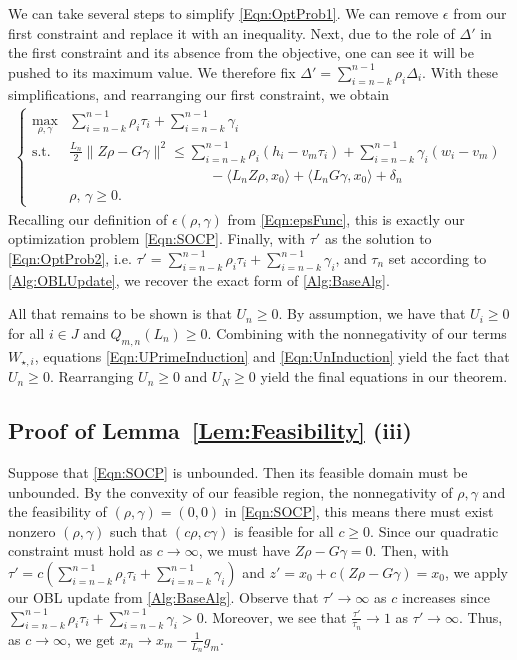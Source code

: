 \documentclass[11pt]{article}
\numberwithin{equation}{section}
\newcommand{\Ucoef}{\rho}
\newcommand{\Wcoef}{\gamma}
\newcommand{\idxArgmin}{m}
\newcommand{\idxMem}{k}
\newcommand{\idxSetSuccess}{J}
\newcommand{\epsFunc}{\epsilon(\Ucoef, \Wcoef)}
\newcommand{\ip}[2]{\sum_{i={n-\idxMem}}^{n-1} {#1}_i {#2}_i}
\newcommand{\fullSum}[1]{\sum_{i={n-\idxMem}}^{n-1} {#1}_i}
\newcommand{\norm}[1]{\|{#1}\|}
\theoremstyle{definition}
\theoremstyle{plain}
\theoremstyle{definition}
\begin{document}
We can take several steps to simplify \eqref{Eqn:OptProb1}. We can remove $\epsilon$ from our first constraint and replace it with an inequality. Next, due to the role of $\Delta'$ in the first constraint and its absence from the objective, one can see it will be pushed to its maximum value. We therefore fix $\Delta' = \ip{\Ucoef}{\Delta}$. With these simplifications, and rearranging our first constraint, we obtain
\begin{align} \label{Eqn:OptProb2}
    \left\{\begin{array}{ll}
            \max_{\Ucoef, \Wcoef} & \ip{\Ucoef}{\tau} + \fullSum{\Wcoef}\\
            \text{s.t.} & \frac{L_n}{2} \norm{Z \Ucoef - G \Wcoef}^2 \leq  \sum_{i=n-k}^{n-1} \Ucoef_i (h_i - v_m \tau_i) + \sum_{i=n-k}^{n-1} \Wcoef_i (w_i - v_m) \\
            & \qquad \qquad \qquad \qquad \qquad - \langle L_n Z \Ucoef, x_0 \rangle + \langle L_n G \Wcoef, x_0 \rangle + \delta_n \\
        & \Ucoef,\, \Wcoef \geq 0.
    \end{array}\right.
\end{align}
Recalling our definition of $\epsFunc$ from \eqref{Eqn:epsFunc}, this is exactly our optimization problem \eqref{Eqn:SOCP}.
Finally, with $\tau'$ as the solution to \eqref{Eqn:OptProb2}, i.e. $\tau' = \ip{\Ucoef}{\tau} + \fullSum{\Wcoef}$, and $\tau_n$ set according to \cref{Alg:OBLUpdate}, we recover the exact form of \cref{Alg:BaseAlg}.

All that remains to be shown is that $U_n \geq 0$. By assumption, we have that $U_i \geq 0$ for all $i \in \idxSetSuccess$ and $Q_{\idxArgmin, n}(L_n) \geq 0$. Combining with the nonnegativity of our terms $W_{\star,i}$, equations \eqref{Eqn:UPrimeInduction} and \eqref{Eqn:UnInduction} yield the fact that $U_n \geq 0$. Rearranging $U_n \geq 0$ and $U_N \geq 0$ yield the final equations in our theorem.


\subsection{Proof of Lemma~\ref{Lem:Feasibility} (iii)} \label{SubSec:FeasibilityProof_Part2}

Suppose that \eqref{Eqn:SOCP} is unbounded. Then its feasible domain must be unbounded. By the convexity of our feasible region, the nonnegativity of $\Ucoef, \Wcoef$ and the feasibility of $(\Ucoef,\Wcoef) = (0,0)$ in \eqref{Eqn:SOCP}, this means there must exist nonzero $(\Ucoef, \Wcoef)$ such that $(c\Ucoef, c\Wcoef)$ is feasible for all $c \geq 0$. Since our quadratic constraint must hold as $c \to \infty$, we must have $Z \Ucoef - G \Wcoef = 0$. Then, with $\tau' = c(\ip{\Ucoef}{\tau} + \fullSum{\Wcoef})$ and $z' = x_0 + c(Z \Ucoef - G \Wcoef) = x_0$, we apply our OBL update from \cref{Alg:BaseAlg}.
Observe that $\tau' \to \infty$ as $c$ increases since $\ip{\Ucoef}{\tau} + \fullSum{\Wcoef} > 0$. Moreover, we see that $\frac{\tau'}{\tau_n} \to 1$ as $\tau' \to \infty$. Thus, as $c \to \infty$, we get $x_n \to x_\idxArgmin - \frac{1}{L_n} g_\idxArgmin$.
\end{document}
